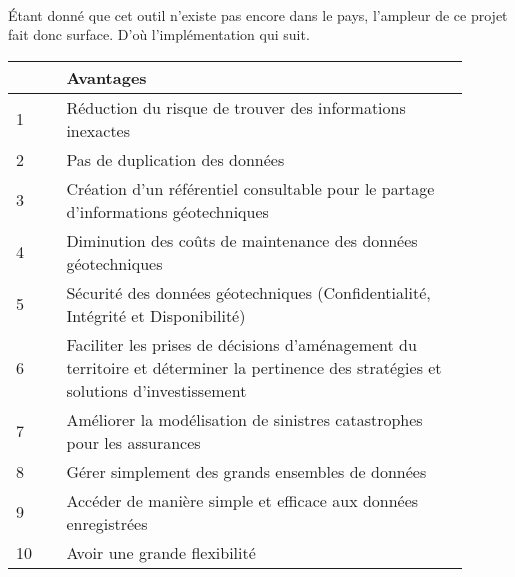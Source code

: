 \paragraph{}
Étant donné que cet outil n'existe pas encore
dans le pays, l'ampleur de ce projet fait donc surface.
D'où l'implémentation qui suit.


\par    
\begin{table}
        \centering
        \begin{tabular}{|p{0.10\linewidth}|p{0.80\linewidth}|}
        \hline
                \textbf{ } & \textbf{Avantages} \\
                \hline
                    1 &
                    Réduction du risque de trouver des informations inexactes
                    \\
                \hline 
                    2 &
                    Pas de duplication des données
                    \\
                \hline 
                    3 &
                    Création d'un référentiel consultable pour le partage d’informations géotechniques
                    \\
                \hline 
                    4 &
                    Diminution des coûts de maintenance des données géotechniques
                    \\
                \hline 
                    5 &
                    Sécurité des données géotechniques (Confidentialité, Intégrité et Disponibilité)
                    \\
                \hline 
                    6 &
                    Faciliter les prises de décisions d’aménagement du territoire 
                    et déterminer la pertinence des stratégies et solutions d’investissement
                    \\
                \hline 
                    7 &
                    Améliorer la modélisation de sinistres catastrophes pour les assurances
                    \\
                \hline 
                    8 &
                    Gérer simplement des grands ensembles de données
                    \\
                \hline 
                    9 &
                    Accéder de manière simple et efficace aux données enregistrées
                    \\
                \hline 
                    10 &
                    Avoir une grande flexibilité

\end{tabular}
\end{table}
